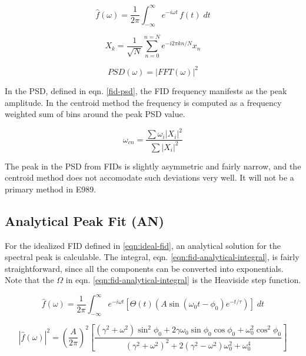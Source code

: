 \begin{equation}
\label{eqn:fid-fft-def}
\hat{f}(\omega) = \frac{1}{2\pi} \int_{-\infty}^{\infty} e^{-i \omega t}\, f(t) \;dt
\end{equation}

\begin{equation}
\label{eqn:fid-dfft-def}
X_k = \frac{1}{\sqrt{N}} \sum_{n=0}^{n=N} e^{-i 2\pi k n / N} x_n
\end{equation}

\begin{equation}
\label{eqn:fid-psd}
PSD(\omega) = |FFT(\omega)|^2
\end{equation}

In the PSD, defined in eqn. \ref{fid-psd}, the FID frequency manifests as the peak amplitude.  In the centroid method the frequency is computed as a frequency weighted sum of bins around the peak PSD value.

\begin{equation}
\label{eqn:freq-cn}
\omega_{cn} = 
\frac{\sum \omega_i |X_i|^2}{\sum |X_i|^2}
\end{equation}

The peak in the PSD from FIDs is slightly asymmetric and fairly narrow, and the centroid method does not accomodate such deviations very well.  It will not be a primary method in E989.

\subsection{Analytical Peak Fit (AN)} \label{s-sec:fid-analytical}
For the idealized FID defined in \ref{eqn:ideal-fid}, an analytical solution for the spectral peak is calculable.  The integral, eqn. \ref{eqn:fid-analytical-integral}, is fairly straightforward, since all the components can be converted into exponentials.  Note that the $\Omega$ in eqn. \ref{eqn:fid-analytical-integral} is the Heaviside step function.

\begin{equation}
\label{eqn:fid-analytical-integral}
\hat{f}(\omega) = \frac{1}{2\pi} \int_{-\infty}^{\infty} 
e^{-i \omega t} \left[ \Theta(t) \left(A \sin(\omega_0 t - \phi_0) e^{-t / \tau} \right) \right] \;dt
\end{equation}

\begin{equation}
\label{eqn:fid-analytical-peak}
\left| \hat{f}(\omega) \right|^2 = 
\left( \frac{A}{2\pi} \right)^2
\left[\frac{(\gamma^2 + \omega^2) \sin^2{\phi_0} 
+ 2 \gamma \omega_0 \sin{\phi_0} \cos{\phi_0} + \omega_0^2 \cos^2{\phi_0}}{(\gamma^2 + \omega^2)^2 + 2(\gamma^2 - \omega^2) \omega_0^2 + \omega_0^4}
\right]
\end{equation}

